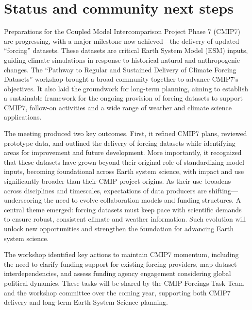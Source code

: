 \documentclass{ametsocV6.1}
\begin{document}
\section*{Status and community next steps}
Preparations for the Coupled Model Intercomparison Project Phase 7 (CMIP7) are progressing, with a major milestone now achieved—the delivery of updated ``forcing'' datasets. These datasets are critical Earth System Model (ESM) inputs, guiding climate simulations in response to historical natural and anthropogenic changes. The ``Pathway to Regular and Sustained Delivery of Climate Forcing Datasets'' workshop brought a broad community together to advance CMIP7’s objectives. It also laid the groundwork for long-term planning, aiming to establish a sustainable framework for the ongoing provision of forcing datasets to support CMIP7, follow-on activities and a wide range of weather and climate science applications.

The meeting produced two key outcomes. First, it refined CMIP7 plans, reviewed prototype data, and outlined the delivery of forcing datasets while identifying areas for improvement and future development. More importantly, it recognized that these datasets have grown beyond their original role of standardizing model inputs, becoming foundational across Earth system science, with impact and use significantly broader than their CMIP project origins. As their use broadens across disciplines and timescales, expectations of data producers are shifting—underscoring the need to evolve collaboration models and funding structures. A central theme emerged: forcing datasets must keep pace with scientific demands to ensure robust, consistent climate and weather information. Such evolution will unlock new opportunities and strengthen the foundation for advancing Earth system science.

The workshop identified key actions to maintain CMIP7 momentum, including the need to clarify funding support for existing forcing providers, map dataset interdependencies, and assess funding agency engagement considering global political dynamics. These tasks will be shared by the CMIP Forcings Task Team and the workshop committee over the coming year, supporting both CMIP7 delivery and long-term Earth System Science planning.
\end{document}
